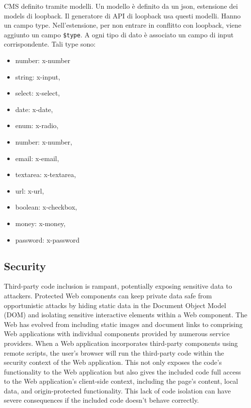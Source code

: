 \documentclass{sig-alternate}
\begin{document}
CMS definito tramite modelli. Un modello è definito da un json, estensione dei models di loopback. Il generatore di API di loopback usa questi modelli. Hanno un campo type. Nell'estensione, per non entrare in conflitto con loopback, viene aggiunto un campo {\tt \$type}.
A ogni tipo di dato è associato un campo di input corrispondente. 
Tali type sono: 

\begin{itemize}
\itemsep1pt\parskip0pt
			 \item number: x-number
			 \item string: x-input,
			 \item select: x-select,
			 \item date: x-date,
			 \item enum: x-radio,
			 \item number: x-number,
			 \item email: x-email,
			 \item textarea: x-textarea,
			 \item url: x-url,
			 \item boolean: x-checkbox,
			 \item money: x-money,
			 \item password: x-password
\end{itemize}

\subsection{Security}

Third-party code inclusion is rampant, potentially exposing sensitive data to attackers. Protected Web components can keep private data safe from opportunistic attacks by hiding static data in the Document Object Model (DOM) and isolating sensitive interactive elements within a Web component.
The Web has evolved from including static images and document links to comprising Web applications with individual components provided by numerous service providers. When a Web application incorporates third-party components using remote scripts, the user's browser will run the third-party code within the security context of the Web application. This not only exposes the code's functionality to the Web application but also gives the included code full access to the Web application's client-side context, including the page's content, local data, and origin-protected functionality. 
This lack of code isolation can have severe consequences if the included code doesn't behave correctly.
\end{document}
